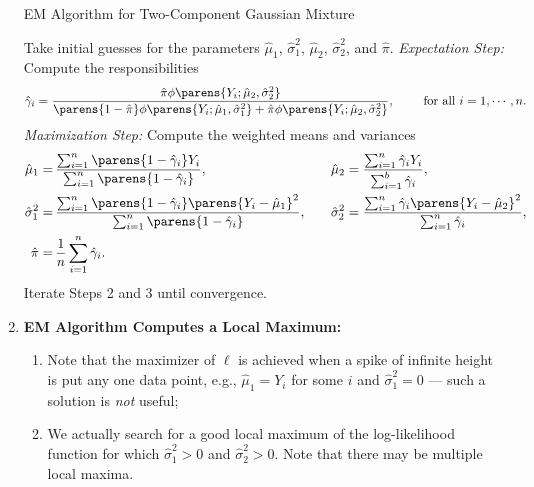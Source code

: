 \documentclass[12pt]{article}
\begin{document}
\begin{enumerate}[label=\textbf{\arabic*.}]
	\begin{minipage}{\linewidth}
		\begin{algorithm}[H]
			\caption{EM Algorithm for Two-Component Gaussian Mixture}\label{algo-em-two-comp-gaussian}
			\begin{algorithmic}[1]
				\STATE Take initial guesses for the parameters $\hat{\mu}_1$, $\hat{\sigma}^2_1$, $\hat{\mu}_2$, $\hat{\sigma}^2_2$, and $\hat{\pi}$. 
				\STATE \textit{Expectation Step:} Compute the responsibilities 
				\begin{align*}
					\hat{\gamma}_{i} = \frac{\hat{\pi} \phi \parens{Y_i; \hat{\mu}_2, \hat{\sigma}_2^2}}{\parens{1 - \hat{\pi}} \phi \parens{Y_i; \hat{\mu}_1, \hat{\sigma}_1^2} + \hat{\pi} \phi \parens{Y_i; \hat{\mu}_2, \hat{\sigma}_2^2}}, \qquad \text{ for all } i = 1, \cdots, n. 
				\end{align*}
				\STATE \textit{Maximization Step:} Compute the weighted means and variances 
				\begin{align*}
					\hat{\mu}_1 = & \, \frac{\sum_{i=1}^n \parens{1 - \hat{\gamma}_i} Y_i}{\sum_{i=1}^n \parens{1 - \hat{\gamma}_i}}, \quad && \hat{\mu}_2 = \frac{\sum_{i=1}^n \hat{\gamma}_i Y_i}{\sum_{i=1}^b \hat{\gamma}_i}, \\ 
					\hat{\sigma}^2_1 = & \, \frac{\sum_{i=1}^n \parens{1 - \hat{\gamma}_i} \parens{Y_i - \hat{\mu}_1}^2}{\sum_{i=1}^n \parens{1 - \hat{\gamma}_i}}, \quad && \hat{\sigma}^2_2 = \frac{\sum_{i=1}^n \hat{\gamma}_i \parens{Y_i - \hat{\mu}_2}^2}{\sum_{i=1}^n \hat{\gamma}_i}, \\ 
					\hat{\pi} = & \, \frac{1}{n} \sum_{i=1}^n \hat{\gamma}_i. 
				\end{align*}
				\STATE Iterate Steps 2 and 3 until convergence. 
			\end{algorithmic}
		\end{algorithm}
	\end{minipage}

	\item \textbf{EM Algorithm Computes a Local Maximum:} 
	\begin{enumerate}
		\item Note that the maximizer of $\ell$ is achieved when a spike of infinite height is put any one data point, e.g., $\hat{\mu}_1 = Y_i$ for some $i$ and $\hat{\sigma}_1^2 = 0$ --- such a solution is \emph{not} useful; 
		\item We actually search for a good local maximum of the log-likelihood function for which $\hat{\sigma}_1^2 > 0$ and $\hat{\sigma}_2^2 > 0$. Note that there may be multiple local maxima. 
	\end{enumerate}

\end{enumerate}
\end{document}
